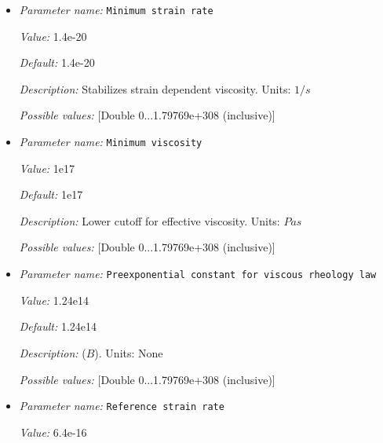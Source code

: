 \begin{itemize}
{\it Default:} 1e28


{\it Description:} Upper cutoff for effective viscosity. Units: $Pa s$


{\it Possible values:} [Double 0...1.79769e+308 (inclusive)]
\item {\it Parameter name:} {\tt Minimum strain rate}
\label{parameters:Material model/Morency and Doin/Minimum strain rate}


{\it Value:} 1.4e-20


{\it Default:} 1.4e-20


{\it Description:} Stabilizes strain dependent viscosity. Units: $1 / s$


{\it Possible values:} [Double 0...1.79769e+308 (inclusive)]
\item {\it Parameter name:} {\tt Minimum viscosity}
\label{parameters:Material model/Morency and Doin/Minimum viscosity}


{\it Value:} 1e17


{\it Default:} 1e17


{\it Description:} Lower cutoff for effective viscosity. Units: $Pa s$


{\it Possible values:} [Double 0...1.79769e+308 (inclusive)]
\item {\it Parameter name:} {\tt Preexponential constant for viscous rheology law}
\label{parameters:Material model/Morency and Doin/Preexponential constant for viscous rheology law}


{\it Value:} 1.24e14


{\it Default:} 1.24e14


{\it Description:} ($B$). Units: None


{\it Possible values:} [Double 0...1.79769e+308 (inclusive)]
\item {\it Parameter name:} {\tt Reference strain rate}
\label{parameters:Material model/Morency and Doin/Reference strain rate}


{\it Value:} 6.4e-16



\end{itemize}
